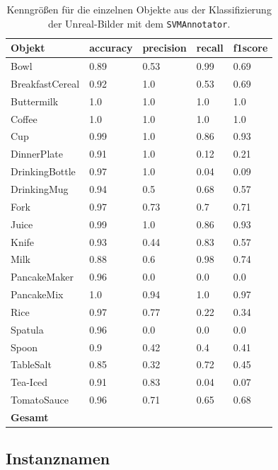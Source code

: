 \begin{table}
\begin{tabularx}{\textwidth}{Xllll}
\textbf{Objekt}	& \textbf{\gls{accuracy}} & \textbf{\gls{precision}}	& \textbf{\gls{recall}}	& \textbf{\gls{f1score}} \\ \hline
Bowl & 0.89 & 0.53 & 0.99 & 0.69 \\  
BreakfastCereal & 0.92 & 1.0 & 0.53 & 0.69 \\  
Buttermilk & 1.0 & 1.0 & 1.0 & 1.0 \\  
Coffee & 1.0 & 1.0 & 1.0 & 1.0 \\  
Cup & 0.99 & 1.0 & 0.86 & 0.93 \\  
DinnerPlate & 0.91 & 1.0 & 0.12 & 0.21 \\  
DrinkingBottle & 0.97 & 1.0 & 0.04 & 0.09 \\  
DrinkingMug & 0.94 & 0.5 & 0.68 & 0.57 \\  
Fork & 0.97 & 0.73 & 0.7 & 0.71 \\  
Juice & 0.99 & 1.0 & 0.86 & 0.93 \\  
Knife & 0.93 & 0.44 & 0.83 & 0.57 \\  
Milk & 0.88 & 0.6 & 0.98 & 0.74 \\  
PancakeMaker & 0.96 & 0.0 & 0.0 & 0.0 \\  
PancakeMix & 1.0 & 0.94 & 1.0 & 0.97 \\  
Rice & 0.97 & 0.77 & 0.22 & 0.34 \\  
Spatula & 0.96 & 0.0 & 0.0 & 0.0 \\  
Spoon & 0.9 & 0.42 & 0.4 & 0.41 \\  
TableSalt & 0.85 & 0.32 & 0.72 & 0.45 \\  
Tea-Iced & 0.91 & 0.83 & 0.04 & 0.07 \\  
TomatoSauce & 0.96 & 0.71 & 0.65 & 0.68 \\    \hline
\textbf{Gesamt}		&	   &	  &      &       \\
\end{tabularx}
\caption[Objekt-spezifische Kenngrößen des SVMAnnotators]{Kenngrößen für die einzelnen Objekte aus der Klassifizierung der Unreal-Bilder mit dem \texttt{SVMAnnotator}.}
\label{tab:SVMClassifierGTClass_metrics}
\end{table}

\subsection{Instanznamen}

